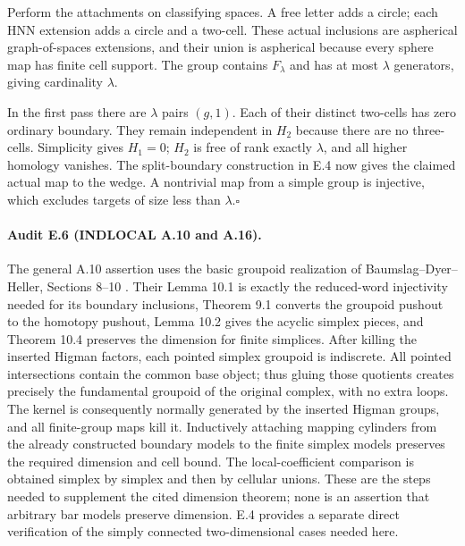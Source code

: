 Perform the attachments on classifying spaces. A free letter adds
a circle; each HNN extension adds a circle and a two-cell.
These actual inclusions are aspherical graph-of-spaces extensions,
and their union is aspherical because every sphere map has finite
cell support. The group contains $F_\lambda$ and has at most
$\lambda$ generators, giving cardinality $\lambda$.

In the first pass there are $\lambda$ pairs $(g,1)$. Each of
their distinct two-cells has zero ordinary boundary. They remain
independent in $H_2$ because there are no three-cells. Simplicity
gives $H_1=0$; $H_2$ is free of rank exactly $\lambda$, and all
higher homology vanishes. The split-boundary construction in E.4
now gives the claimed actual map to the wedge. A nontrivial map
from a simple group is injective, which excludes targets of
size less than $\lambda$.\hfill$\square$

\paragraph{Audit E.6 (INDLOCAL A.10 and A.16).}
The general A.10 assertion uses the basic groupoid realization
of Baumslag--Dyer--Heller, Sections 8--10
\cite{EBaumslagDyerHeller1980}. Their Lemma 10.1 is
exactly the reduced-word injectivity needed for its boundary
inclusions, Theorem 9.1 converts the groupoid pushout to the
homotopy pushout, Lemma 10.2 gives the acyclic simplex pieces,
and Theorem 10.4 preserves the dimension for finite simplices.
After killing the inserted Higman factors, each pointed
simplex groupoid is indiscrete. All pointed intersections
contain the common base object; thus gluing those quotients
creates precisely the fundamental groupoid of the original
complex, with no extra loops. The kernel is consequently
normally generated by the inserted Higman groups, and all
finite-group maps kill it. Inductively attaching mapping
cylinders from the already constructed boundary models to
the finite simplex models preserves the required dimension
and cell bound. The local-coefficient comparison is obtained
simplex by simplex and then by cellular unions. These are
the steps needed to supplement the cited dimension theorem;
none is an assertion that arbitrary bar models preserve
dimension. E.4 provides a separate direct verification of
the simply connected two-dimensional cases needed here.

